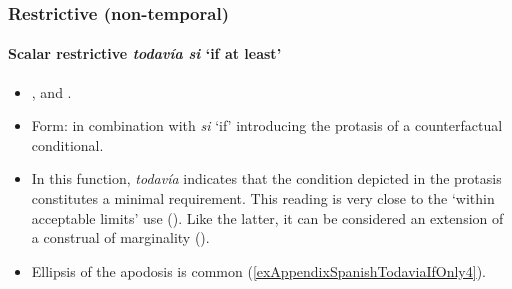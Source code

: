 \subsubsection{Restrictive (non-temporal)}
\paragraph{Scalar restrictive \textit{todavía si} \lq if at least'}
\label{appendixSpanishTodaviaIfAtLeast}
\begin{itemize}
	\item \textcite{Bosque2016}, \textcite{Deloor2012} and \textcite[s.v. \textit{todavía}]{RAEDictionary}.
	\item Form: in combination with \textit{si} \lq if' introducing the protasis of a counterfactual conditional.
	\item In this function, \textit{todavía} indicates that the condition depicted in the protasis constitutes a minimal requirement.	This reading is very close to the \lq within acceptable limits' use (). Like the latter, it can be considered an extension of a construal of marginality ().
	\item Ellipsis of the apodosis is common (\ref{exAppendixSpanishTodaviaIfOnly4}).
\end{itemize}
